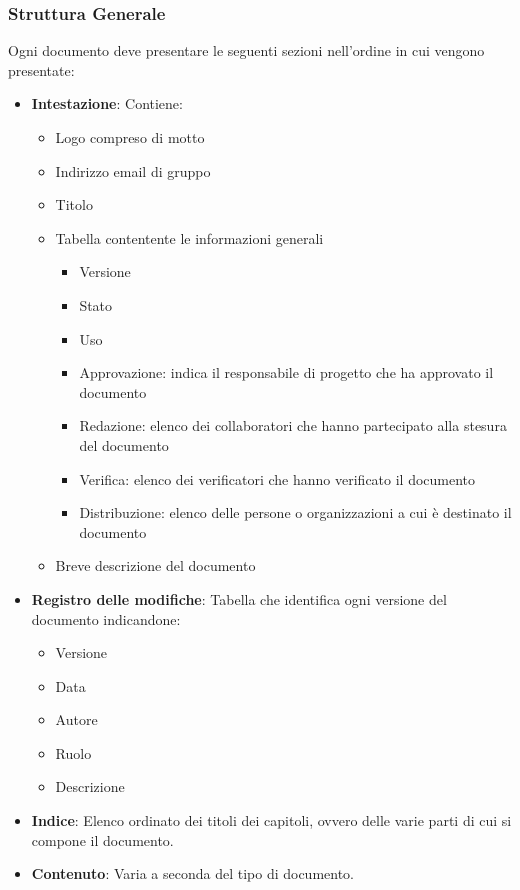 \subsubsection{Struttura Generale}
Ogni documento deve presentare le seguenti sezioni nell'ordine in cui vengono presentate:
\begin{itemize} 
    \item \textbf{Intestazione}:
    Contiene:
    \begin{itemize} 
        \item Logo compreso di motto
        \item Indirizzo email di gruppo 
        \item Titolo
        \item Tabella contentente le informazioni generali
        \begin{itemize}
            \item Versione
            \item Stato
            \item Uso
            \item Approvazione: indica il responsabile di progetto che ha approvato il documento 
            \item Redazione: elenco dei collaboratori che hanno partecipato alla stesura del documento
            \item Verifica: elenco dei verificatori che hanno verificato il documento
            \item Distribuzione: elenco delle persone o organizzazioni a cui è destinato il documento
        \end{itemize}
        \item Breve descrizione del documento 
    \end{itemize}
    \item \textbf{Registro delle modifiche}:
    Tabella che identifica ogni versione del documento indicandone:
    \begin{itemize} 
        \item Versione
        \item Data
        \item Autore
        \item Ruolo
        \item Descrizione
    \end{itemize}
    \item \textbf{Indice}:
    Elenco ordinato dei titoli dei capitoli, ovvero delle varie parti di cui si compone il documento.
    \item \textbf{Contenuto}:
    Varia a seconda del tipo di documento.
\end{itemize}

